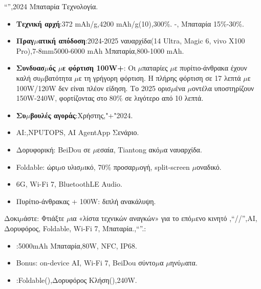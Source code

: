 
“”,2024 Μπαταρία Τεχνολογία.

\begin{itemize}
  \item \textbf{Τεχνική αρχή}:372 mAh/g,4200 mAh/g(10),300\%. -, Μπαταρία 15\%-30\%.
  \item \textbf{Πραγ$\mu$ατική απόδοση}:2024-2025 ναυαρχίδα(14 Ultra, Magic 6, vivo X100 Pro),7-8mm5000-6000 mAh Μπαταρία,800-1000 mAh.
  \item \textbf{Συνδυασ$\mu$ός $\mu$ε φόρτιση 100W+}: Οι $\mu$παταρίες $\mu$ε πυρίτιο-άνθρακα έχουν καλή συ$\mu$βατότητα $\mu$ε τη γρήγορη φόρτιση. Η πλήρης φόρτιση σε 17 λεπτά $\mu$ε 100W/120W δεν είναι πλέον είδηση. Το 2025 ορισ$\mu$ένα $\mu$οντέλα υποστηρίζουν 150W-240W, φορτίζοντας στο 80\% σε λιγότερο από 10 λεπτά.
  \item \textbf{Συ$\mu$βουλές αγοράς}:Χρήστης,"+"2024.
\end{itemize}


\begin{itemize}
  \item AI:,NPUTOPS, AI AgentApp Σενάριο.
  \item Δορυφορική: BeiDou σε $\mu$εσαία, Tiantong ακό$\mu$α ναυαρχίδα.
  \item Foldable: ώρι$\mu$ο υλισ$\mu$ικό, 70\% προσαρ$\mu$ογή, split-screen $\mu$οναδικό.
  \item 6G, Wi-Fi 7, BluetoothLE Audio.
  \item Πυρίτιο-άνθρακας + 100W: διπλή ανακάλυψη.
\end{itemize}

\begin{tcbpractice}{Δοκι$\mu$άστε: Φτιάξτε $\mu$ια «λίστα τεχνικών αναγκών» για το επό$\mu$ενο κινητό}
,“//”,AI, Δορυφόρος, Foldable, Wi-Fi 7, Μπαταρία.,“”.:

\begin{itemize}
  \item :5000mAh Μπαταρία,80W, NFC, IP68.
  \item Bonus: on-device AI, Wi-Fi 7, BeiDou σύντο$\mu$α $\mu$ηνύ$\mu$ατα.
  \item :Foldable(),Δορυφόρος Κλήση(),240W.
\end{itemize}

\end{tcbpractice}

